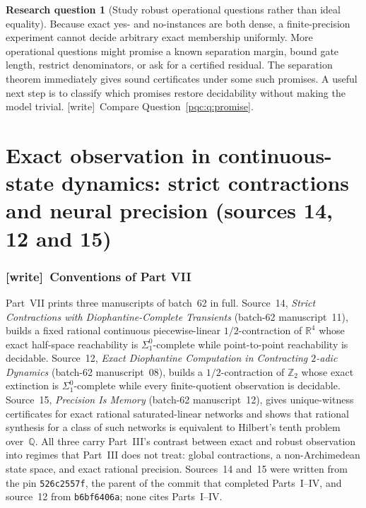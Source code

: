\documentclass[11pt,letterpaper]{article}
\numberwithin{equation}{section}
\theoremstyle{definition}
\newtheorem{question}{Research question}
\theoremstyle{remark}
\newcommand{\Q}{\mathbb Q}
\newcommand{\R}{\mathbb R}
\newcommand{\code}[1]{\nolinkurl{#1}}
\newcommand{\wtag}{\textup{[write]}}
\newcommand{\sigone}{\Sigma^0_1}
\newcommand{\Ztwo}{\mathbb Z_2}
\begin{document}
\begin{question}[Study robust operational questions rather than ideal equality]
\label{pqc:dr:q:robust}
Because exact yes- and no-instances are both dense, a finite-precision
experiment cannot decide arbitrary exact membership uniformly. More
operational questions might promise a known separation margin, bound
gate length, restrict denominators, or ask for a certified residual.
The separation theorem immediately gives sound certificates under
some such promises. A useful next step is to classify which promises
restore decidability without making the model trivial.
\wtag\ Compare Question~\ref{pqc:q:promise}.
\end{question}

\part{Exact observation in continuous-state dynamics: strict contractions and neural precision (sources 14, 12 and 15)}
\label{pqc:part:b62-VII}

\section{\wtag\ Conventions of Part VII}
\label{pqc:conv:b62-VII}

Part~VII prints three manuscripts of batch~62 in full. Source~14,
\emph{Strict Contractions with Diophantine-Complete Transients} (batch-62
manuscript~11), builds a fixed rational continuous piecewise-linear
$1/2$-contraction of $\R^4$ whose exact half-space reachability is
$\sigone$-complete while point-to-point reachability is decidable. Source~12,
\emph{Exact Diophantine Computation in Contracting $2$-adic Dynamics}
(batch-62 manuscript~08), builds a $1/2$-contraction of $\Ztwo$ whose exact
extinction is $\sigone$-complete while every finite-quotient observation is
decidable. Source~15, \emph{Precision Is Memory} (batch-62 manuscript~12), gives
unique-witness certificates for exact rational saturated-linear networks and
shows that rational synthesis for a class of such networks is equivalent to
Hilbert's tenth problem over~$\Q$. All three carry Part~III's contrast between
exact and robust observation into regimes that Part~III does not treat: global
contractions, a non-Archimedean state space, and exact rational precision.
Sources~14 and~15 were written from the pin \code{526c2557f}, the parent of the
commit that completed Parts~I--IV, and source~12 from \code{b6bf6406a}; none
cites Parts~I--IV.
\end{document}
